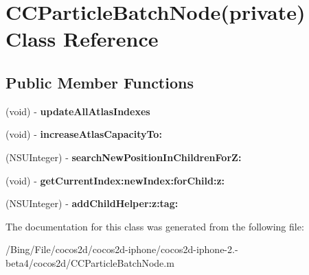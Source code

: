 \hypertarget{interface_c_c_particle_batch_node_07private_08}{\section{C\-C\-Particle\-Batch\-Node(private) Class Reference}
\label{interface_c_c_particle_batch_node_07private_08}
}
\subsection*{Public Member Functions}
\begin{DoxyCompactItemize}
\item 
\hypertarget{interface_c_c_particle_batch_node_07private_08_aeabab1a73c8e9aa5bcce94026309bfdf}{(void) -\/ {\bfseries update\-All\-Atlas\-Indexes}}\label{interface_c_c_particle_batch_node_07private_08_aeabab1a73c8e9aa5bcce94026309bfdf}

\item 
\hypertarget{interface_c_c_particle_batch_node_07private_08_a72003294c32923f58c1ccd0c16811a70}{(void) -\/ {\bfseries increase\-Atlas\-Capacity\-To\-:}}\label{interface_c_c_particle_batch_node_07private_08_a72003294c32923f58c1ccd0c16811a70}

\item 
\hypertarget{interface_c_c_particle_batch_node_07private_08_a7efade9e4347ac8cac3588be9a1578bf}{(N\-S\-U\-Integer) -\/ {\bfseries search\-New\-Position\-In\-Children\-For\-Z\-:}}\label{interface_c_c_particle_batch_node_07private_08_a7efade9e4347ac8cac3588be9a1578bf}

\item 
\hypertarget{interface_c_c_particle_batch_node_07private_08_a8e93138c9a95f632fa6f69aa3f9cfaa7}{(void) -\/ {\bfseries get\-Current\-Index\-:new\-Index\-:for\-Child\-:z\-:}}\label{interface_c_c_particle_batch_node_07private_08_a8e93138c9a95f632fa6f69aa3f9cfaa7}

\item 
\hypertarget{interface_c_c_particle_batch_node_07private_08_abf2963919b64ab423a9ba3bbaf10ab41}{(N\-S\-U\-Integer) -\/ {\bfseries add\-Child\-Helper\-:z\-:tag\-:}}\label{interface_c_c_particle_batch_node_07private_08_abf2963919b64ab423a9ba3bbaf10ab41}

\end{DoxyCompactItemize}


The documentation for this class was generated from the following file\-:\begin{DoxyCompactItemize}
\item 
/\-Bing/\-File/cocos2d/cocos2d-\/iphone/cocos2d-\/iphone-\/2.-\/beta4/cocos2d/C\-C\-Particle\-Batch\-Node.\-m\end{DoxyCompactItemize}
